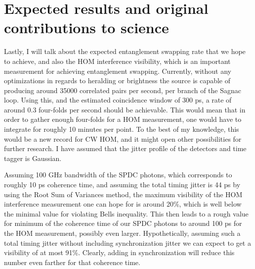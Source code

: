\documentclass{article}
\theoremstyle{mytheoremstyle}
\theoremstyle{mytheoremstyle}
\theoremstyle{myproblemstyle}
\begin{document}
\section{Expected results and original contributions to science}
Lastly, I will talk about the expected entanglement swapping rate that we hope to achieve, and also the HOM interference visibility, which
is an important measurement for achieving entanglement swapping. Currently, without any optimizations in regards to heralding
or brightness the source is capable of producing around 35000 correlated pairs per second, per branch of the Sagnac loop.
Using this, and the estimated coincidence window of 300 ps, a rate of around 0.3 four-folds per second should be achievable.
This would mean that in order to gather enough four-folds for a HOM measurement, one would have to integrate for roughly 10 minutes per point.
To the best of my knowledge, this would be a new record for CW HOM, and it might open other possibilities for further research.
I have assumed that the jitter profile of the detectors and time tagger is Gaussian.

Assuming 100 GHz bandwidth of the SPDC photons, which corresponds to roughly 10 ps coherence time, and assuming the total timing jitter is
44 ps by using the Root Sum of Variances method,
the maximum visibility of the HOM interference measurement one can hope for is around 20\%, which is well below the minimal value for violating
Bells inequality.
This then leads to a rough value for minimum of the coherence time of our SPDC photons to around 100 ps for the HOM measurement, possibly even larger.
Hypothetically, assuming such a total timing jitter without including synchronization jitter we can expect to get a visibility of at most 91\%. Clearly,
adding in synchronization will reduce this number even farther for that coherence time.
\end{document}
